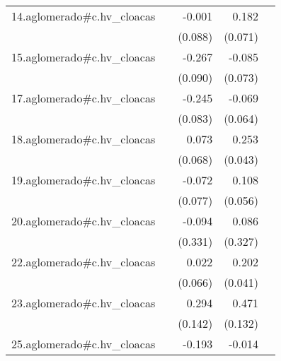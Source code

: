 {\begin{longtable}{l*{4}{D{.}{.}{-1}}}
\addlinespace
14.aglomerado#c.hv\_cloacas&                     &      -0.001         &       0.182\sym{*}  &                     \\
            &                     &     (0.088)         &     (0.071)         &                     \\
\addlinespace
15.aglomerado#c.hv\_cloacas&                     &      -0.267\sym{**} &      -0.085         &                     \\
            &                     &     (0.090)         &     (0.073)         &                     \\
\addlinespace
17.aglomerado#c.hv\_cloacas&                     &      -0.245\sym{**} &      -0.069         &                     \\
            &                     &     (0.083)         &     (0.064)         &                     \\
\addlinespace
18.aglomerado#c.hv\_cloacas&                     &       0.073         &       0.253\sym{***}&                     \\
            &                     &     (0.068)         &     (0.043)         &                     \\
\addlinespace
19.aglomerado#c.hv\_cloacas&                     &      -0.072         &       0.108         &                     \\
            &                     &     (0.077)         &     (0.056)         &                     \\
\addlinespace
20.aglomerado#c.hv\_cloacas&                     &      -0.094         &       0.086         &                     \\
            &                     &     (0.331)         &     (0.327)         &                     \\
\addlinespace
22.aglomerado#c.hv\_cloacas&                     &       0.022         &       0.202\sym{***}&                     \\
            &                     &     (0.066)         &     (0.041)         &                     \\
\addlinespace
23.aglomerado#c.hv\_cloacas&                     &       0.294\sym{*}  &       0.471\sym{***}&                     \\
            &                     &     (0.142)         &     (0.132)         &                     \\
\addlinespace
25.aglomerado#c.hv\_cloacas&                     &      -0.193\sym{*}  &      -0.014         &                     \\

\end{longtable}}
